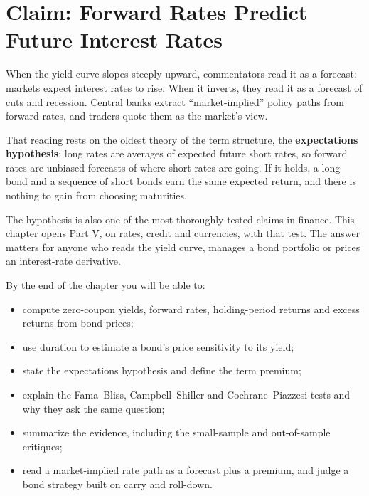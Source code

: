 \makeatletter
{}
\makeatother

\chapter{Claim: Forward Rates Predict Future Interest Rates}
\label{ch:16}

When the yield curve slopes steeply upward, commentators read it as a forecast: markets expect interest rates to rise. When it inverts, they read it as a forecast of cuts and recession. Central banks extract ``market-implied'' policy paths from forward rates, and traders quote them as the market's view.

That reading rests on the oldest theory of the term structure, the \textbf{expectations hypothesis}: long rates are averages of expected future short rates, so forward rates are unbiased forecasts of where short rates are going. If it holds, a long bond and a sequence of short bonds earn the same expected return, and there is nothing to gain from choosing maturities.

The hypothesis is also one of the most thoroughly tested claims in finance. This chapter opens Part V, on rates, credit and currencies, with that test. The answer matters for anyone who reads the yield curve, manages a bond portfolio or prices an interest-rate derivative.

By the end of the chapter you will be able to:

\begin{itemize}
  \item compute zero-coupon yields, forward rates, holding-period returns and excess returns from bond prices;
  \item use duration to estimate a bond's price sensitivity to its yield;
  \item state the expectations hypothesis and define the term premium;
  \item explain the Fama--Bliss, Campbell--Shiller and Cochrane--Piazzesi tests and why they ask the same question;
  \item summarize the evidence, including the small-sample and out-of-sample critiques;
  \item read a market-implied rate path as a forecast plus a premium, and judge a bond strategy built on carry and roll-down.
\end{itemize}

